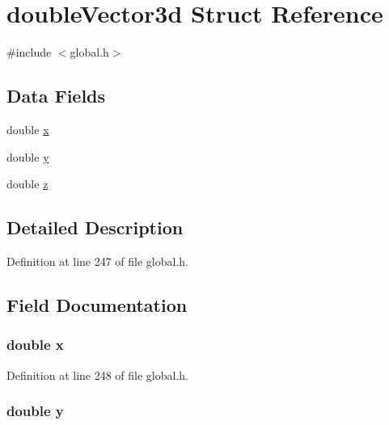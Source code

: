 \hypertarget{structdoubleVector3d}{\section{double\-Vector3d Struct Reference}
\label{structdoubleVector3d}
}


{\ttfamily \#include $<$global.\-h$>$}

\subsection*{Data Fields}
\begin{DoxyCompactItemize}
\item 
double \hyperlink{structdoubleVector3d_af88b946fb90d5f08b5fb740c70e98c10}{x}
\item 
double \hyperlink{structdoubleVector3d_ab927965981178aa1fba979a37168db2a}{y}
\item 
double \hyperlink{structdoubleVector3d_ab3e6ed577a7c669c19de1f9c1b46c872}{z}
\end{DoxyCompactItemize}


\subsection{Detailed Description}


Definition at line 247 of file global.\-h.



\subsection{Field Documentation}
\hypertarget{structdoubleVector3d_af88b946fb90d5f08b5fb740c70e98c10}{
\subsubsection[{x}]{\setlength{\rightskip}{0pt plus 5cm}double x}}\label{structdoubleVector3d_af88b946fb90d5f08b5fb740c70e98c10}


Definition at line 248 of file global.\-h.

\hypertarget{structdoubleVector3d_ab927965981178aa1fba979a37168db2a}{
\subsubsection[{y}]{\setlength{\rightskip}{0pt plus 5cm}double y}}\label{structdoubleVector3d_ab927965981178aa1fba979a37168db2a}


